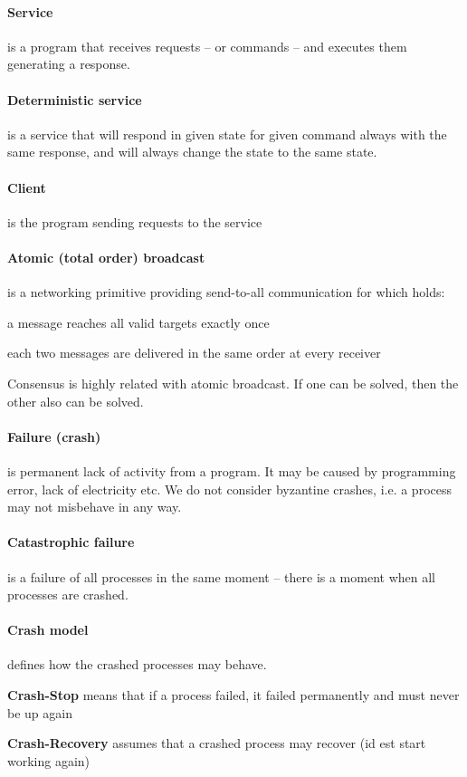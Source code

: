 \paragraph{Service}
is a program that receives requests -- or commands -- and executes them generating a response.

\paragraph{Deterministic service}
is a service that will respond in given state for given command always with the same response, and will always change the state to the same state.

\paragraph{Client}
is the program sending requests to the service

\paragraph{Atomic (total order) broadcast}
is a networking primitive providing send-to-all communication for which holds:
\begin{tightList}
 \item[\textbullet] a message reaches all valid targets exactly once
 \item[\textbullet] each two messages are delivered in the same order at every receiver
\end{tightList}

\noindent Consensus is highly related with atomic broadcast. If one can be solved, then the other also can be solved.

\paragraph{Failure (crash)}
is permanent lack of activity from a program. It may be caused by programming error, lack of electricity etc.
We do not consider byzantine crashes, i.e. a process may not misbehave in any way.

\paragraph{Catastrophic failure} is a failure of all processes in the same moment -- there is a moment when all processes are crashed.

\paragraph{Crash model}
defines how the crashed processes may behave.
\begin{tightList}[ \setlength{\leftmargin}{2\leftmargin}]
 \item[\textbf{Crash-Stop}] means that if a process failed, it failed permanently and must never be up again
 \item[\textbf{Crash-Recovery}] assumes that a crashed process may recover (id est start working again)
\end{tightList}

